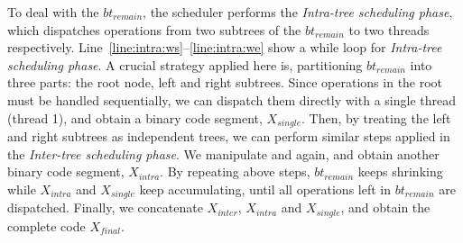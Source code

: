 To deal with the $bt_{remain}$, 
the scheduler performs the \textit{Intra-tree scheduling phase}, 
which dispatches operations from two subtrees of the $bt_{remain}$ to two threads respectively.
Line~\ref{line:intra:ws}--\ref{line:intra:we} show a while loop for \textit{Intra-tree scheduling phase}.
A crucial strategy applied here is, partitioning $bt_{remain}$ into three parts:
the root node, left and right subtrees.
Since operations in the root must be handled sequentially, 
we can dispatch them directly with a single thread (thread 1), 
and obtain a binary code segment, $X_{single}$.
Then, by treating the left and right subtrees as independent trees, 
we can perform similar steps applied in the \textit{Inter-tree scheduling phase}.
We manipulate  and  again, and obtain another binary code segment, $X_{intra}$.
By repeating above steps, $bt_{remain}$ keeps shrinking while $X_{intra}$ and $X_{single}$ keep accumulating,
until all operations left in $bt_{remain}$ are dispatched.
Finally, we concatenate $X_{inter}$, $X_{intra}$ and $X_{single}$,
and obtain the complete code $X_{final}$.
